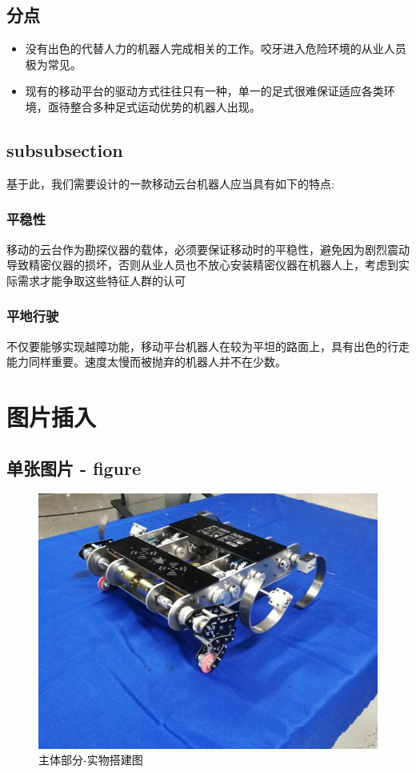 \documentclass[a4paper, 11pt]{article}   %
\begin{document}
\begin{CJK}{UTF8}{gbsn}
\begin{spacing}{1.15}
\subsection{分点}
\begin{itemize}
\item 没有出色的代替人力的机器人完成相关的工作。咬牙进入危险环境的从业人员极为常见。
\item 现有的移动平台的驱动方式往往只有一种，单一的足式很难保证适应各类环境，亟待整合多种足式运动优势的机器人出现。
\end{itemize}

\subsection{subsubsection}
\label{sec:features}
基于此，我们需要设计的一款移动云台机器人应当具有如下的特点:

\subsubsection{平稳性}
\label{sec:requirements}
移动的云台作为勘探仪器的载体，必须要保证移动时的平稳性，避免因为剧烈震动导致精密仪器的损坏，否则从业人员也不放心安装精密仪器在机器人上，考虑到实际需求才能争取这些特征人群的认可

\subsubsection{平地行驶}
\label{sec:format}
不仅要能够实现越障功能，移动平台机器人在较为平坦的路面上，具有出色的行走能力同样重要。速度太慢而被抛弃的机器人并不在少数。


\newpage                                    %

\section{图片插入}
\subsection{单张图片 - figure}

\begin{figure}[H]
\centering
\includegraphics[width=.8\textwidth]{chap2//fig1.jpg}
\caption{主体部分-实物搭建图}
\end{figure}


\end{spacing}
\end{CJK}
\end{document}

